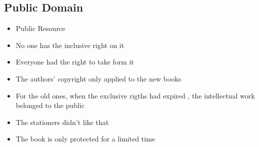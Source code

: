 \documentclass{article}
\begin{document}
\subsection{Public Domain }
\begin{itemize}
\item Public Resource 
\item No one has the inclusive right on it 
\item Everyone had the right to take form it 
\item The authors' copyright only applied to the new books 
\item For the old ones, when the exclusive rigths had expired , the intellectual work belonged to the public 
\item The stationers didn't like that 
\item The book is only protected for a limited time 
\end{itemize}
\end{document}
